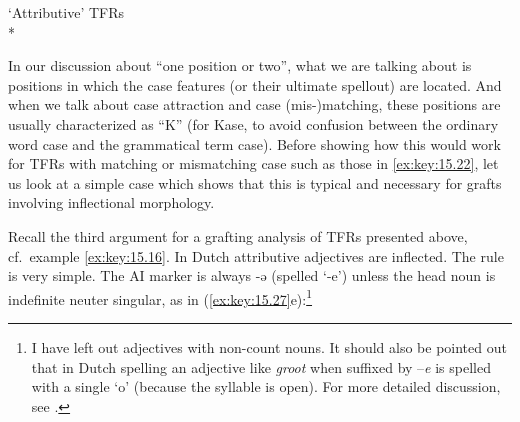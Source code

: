 \documentclass[output=paper]{langsci/langscibook}
\begin{document}
\begin{refcontext}
\ea\label{ex:key:15.26} \enquote*{Attributive} \glspl{TFR}\\*
\z

In our discussion about \enquote{one position or two}, what we are talking
about is positions  in which the case features (or their ultimate spellout) are
located.  And when we talk about case attraction and case (mis-)matching, these
positions are usually characterized as \enquote{K} (for Kase, to avoid
confusion between the ordinary word case and the grammatical term case). Before
showing how this would work for \glspl{TFR} with matching or mismatching case
such as those in \eqref{ex:key:15.22}, let us look at a simple case which shows
that this is typical and necessary for grafts involving inflectional
morphology.

Recall the third argument for a grafting analysis of \glspl{TFR} presented
above, cf.\ example \eqref{ex:key:15.16}. In Dutch attributive adjectives are inflected. The
rule is very simple. The \gls{AI} marker is always -ə
(spelled ‘-e’) unless the head noun is indefinite neuter singular, as in
(\ref{ex:key:15.27}e):\footnote{I have left out adjectives with non-count nouns. It should also
    be pointed out that in Dutch spelling an adjective like \emph{groot} when
    suffixed by –\emph{e}  is spelled with a single ‘o’ (because the syllable
is open). For more detailed discussion, see
\textcites[11--13]{Broekhuis2013a}.}


\end{refcontext}
\end{document}
